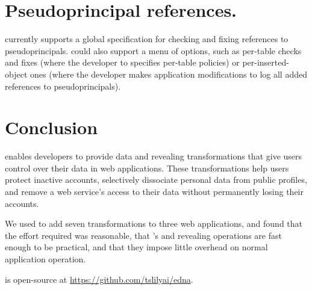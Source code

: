 \section{Pseudoprincipal references.}
%
\sys currently supports a global specification for checking and fixing references to
pseudoprincipals.
%
\sys could also support a menu of options, such
as per-table checks and fixes (where the developer to specifies per-table
policies) or per-inserted-object ones (where the developer makes application
modifications to log all added references to pseudoprincipals).

\section{Conclusion}
\label{s:concl}

%
\sys enables developers to provide data \xxing and revealing
transformations that give users control over their data in web applications.
%
These transformations help users protect inactive accounts, selectively dissociate
personal data from public profiles, and remove a web service's access to their
data without permanently losing their accounts.
%

%
We used \sys to add seven \xxing transformations to three web applications, and
found that the effort required was reasonable, that \sys's \xxing and
revealing operations are fast enough to be practical, and that they impose
little overhead on normal application operation.
%

%
\sys is open-source at \url{https://github.com/tslilyai/edna}.
%
